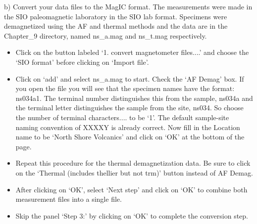 {b) Convert your data files to the MagIC format.   The measurements were made in the SIO paleomagnetic laboratory in the SIO lab format.  Specimens were demagnetized using the AF and thermal methods and the data are in the Chapter\_9 directory, named ns\_a.mag and ns\_t.mag respectively.  

\begin{itemize}
\item  Click on the button labeled `1. convert magnetometer files....'  and choose the `SIO format' before clicking on `Import file'.   
\item Click on `add'  and select ns\_a.mag to start.  Check the `AF Demag' box.  If you open the file you will see that the specimen names have the format:  ns034a1.   The terminal number distinguishes this from the sample, ns034a and the terminal letter distinguishes the sample from the site, ns034.  So choose the number of terminal characters....  to be `1'.  The default sample-site naming convention of XXXXY is already correct.  Now fill in the Location name to be `North Shore Volcanics' and click on `OK' at the bottom of the page.  
\item  Repeat this procedure for the thermal demagnetization data.  Be sure to click on the `Thermal (includes thellier but not trm)' button instead of AF Demag.  
\item After clicking on `OK', select `Next step'  and click on 	`OK'  to combine both measurement files into a single file.  
\item Skip the panel `Step 3:' by clicking on `OK'  to complete the conversion step.   
\end{itemize}

}
